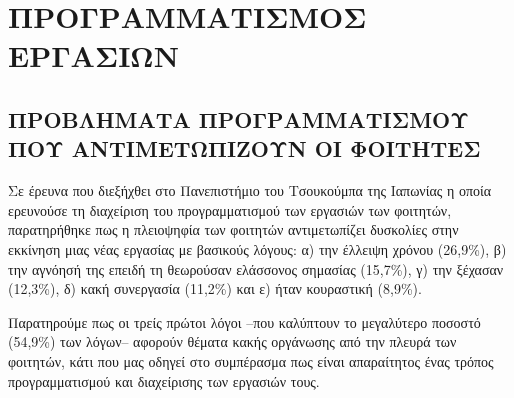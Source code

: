 \chapter{ΠΡΟΓΡΑΜΜΑΤΙΣΜΟΣ ΕΡΓΑΣΙΩΝ}

    \section{ΠΡΟΒΛΗΜΑΤΑ ΠΡΟΓΡΑΜΜΑΤΙΣΜΟΥ ΠΟΥ ΑΝΤΙΜΕΤΩΠΙΖΟΥΝ ΟΙ ΦΟΙΤΗΤΕΣ}
        Σε έρευνα \cite{Fukuzawa2015} που διεξήχθει στο Πανεπιστήμιο του Τσουκούμπα της Ιαπωνίας η οποία ερευνούσε τη διαχείριση του προγραμματισμού των εργασιών των φοιτητών,
            παρατηρήθηκε πως η πλειοψηφία των φοιτητών αντιμετωπίζει δυσκολίες στην εκκίνηση μιας νέας εργασίας με βασικούς λόγους:
            α) την έλλειψη χρόνου (26,9\%), β) την αγνόησή της επειδή τη θεωρούσαν ελάσσονος σημασίας (15,7\%), γ) την ξέχασαν (12,3\%), δ) κακή συνεργασία (11,2\%) και ε) ήταν κουραστική (8,9\%).

        Παρατηρούμε πως οι τρείς πρώτοι λόγοι --που καλύπτουν το μεγαλύτερο ποσοστό (54,9\%) των λόγων-- αφορούν θέματα κακής οργάνωσης από την πλευρά των φοιτητών,
            κάτι που μας οδηγεί στο συμπέρασμα πως είναι απαραίτητος ένας τρόπος προγραμματισμού και διαχείρισης των εργασιών τους.